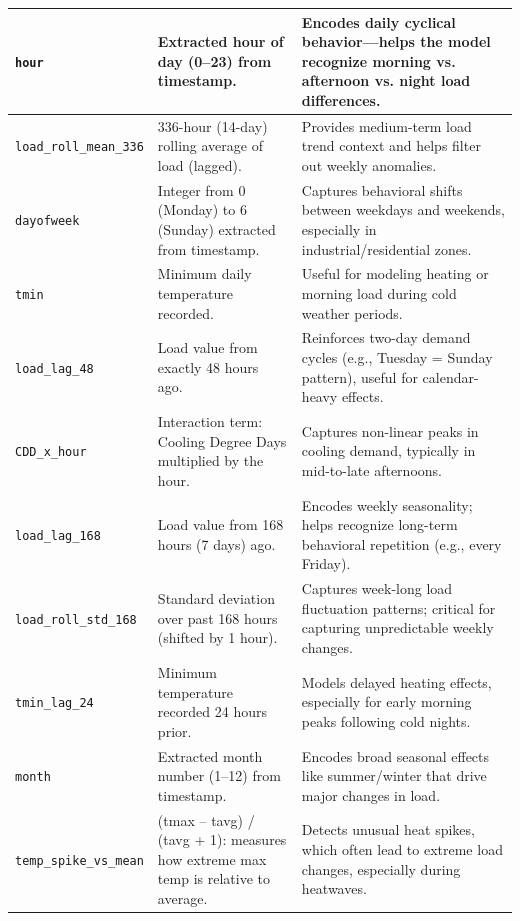 \documentclass{ifacconf}
\begin{document}
\begin{table}[p]
\begin{adjustbox}{width=\textwidth}
\begin{tabular}{|p{4cm}|p{6cm}|p{6cm}|}
\texttt{hour} & Extracted hour of day (0–23) from timestamp. & Encodes daily cyclical behavior—helps the model recognize morning vs. afternoon vs. night load differences. \\
\hline
\texttt{load\_roll\_mean\_336} & 336-hour (14-day) rolling average of load (lagged). & Provides medium-term load trend context and helps filter out weekly anomalies. \\
\hline
\texttt{dayofweek} & Integer from 0 (Monday) to 6 (Sunday) extracted from timestamp. & Captures behavioral shifts between weekdays and weekends, especially in industrial/residential zones. \\
\hline
\texttt{tmin} & Minimum daily temperature recorded. & Useful for modeling heating or morning load during cold weather periods. \\
\hline
\texttt{load\_lag\_48} & Load value from exactly 48 hours ago. & Reinforces two-day demand cycles (e.g., Tuesday = Sunday pattern), useful for calendar-heavy effects. \\
\hline
\texttt{CDD\_x\_hour} & Interaction term: Cooling Degree Days multiplied by the hour. & Captures non-linear peaks in cooling demand, typically in mid-to-late afternoons. \\
\hline
\texttt{load\_lag\_168} & Load value from 168 hours (7 days) ago. & Encodes weekly seasonality; helps recognize long-term behavioral repetition (e.g., every Friday). \\
\hline
\texttt{load\_roll\_std\_168} & Standard deviation over past 168 hours (shifted by 1 hour). & Captures week-long load fluctuation patterns; critical for capturing unpredictable weekly changes. \\
\hline
\texttt{tmin\_lag\_24} & Minimum temperature recorded 24 hours prior. & Models delayed heating effects, especially for early morning peaks following cold nights. \\
\hline
\texttt{month} & Extracted month number (1–12) from timestamp. & Encodes broad seasonal effects like summer/winter that drive major changes in load. \\
\hline
\texttt{temp\_spike\_vs\_mean} & (tmax – tavg) / (tavg + 1): measures how extreme max temp is relative to average. & Detects unusual heat spikes, which often lead to extreme load changes, especially during heatwaves. \\
\hline
\end{tabular}
\end{adjustbox}
\label{tab:shap_features}
\end{table}
\clearpage
\end{document}
